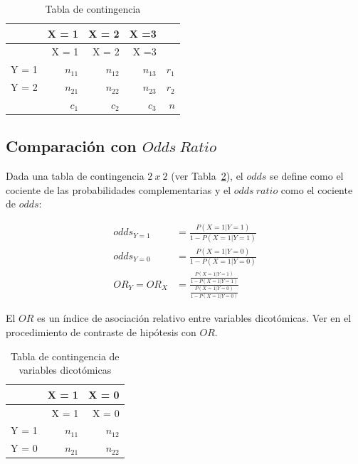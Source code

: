 \documentclass[
  12pt,
  a4paper,
  extrafontsizes,
  onecolumn,
  openright]{memoir}
\begin{document}
\hypertarget{tbl-contingencia}{}
\begin{longtable}[]{@{}lrrrr@{}}
\caption{\label{tbl-contingencia}Tabla de contingencia}\tabularnewline
\toprule\noalign{}
& X = 1 & X = 2 & X =3 & \\
\midrule\noalign{}
\endfirsthead
\toprule\noalign{}
& X = 1 & X = 2 & X =3 & \\
\midrule\noalign{}
\endhead
\bottomrule\noalign{}
\endlastfoot
Y = 1 & \(n_{11}\) & \(n_{12}\) & \(n_{13}\) & \(r_1\) \\
Y = 2 & \(n_{21}\) & \(n_{22}\) & \(n_{23}\) & \(r_2\) \\
& \(c_1\) & \(c_2\) & \(c_3\) & \(n\) \\
\end{longtable}

\hypertarget{sec-or}{%
\subsection{\texorpdfstring{Comparación con
\(Odds\ Ratio\)}{Comparación con Odds\textbackslash{} Ratio}}\label{sec-or}}

Dada una tabla de contingencia \(2\ x\ 2\) (ver
Tabla~\ref{tbl-contingencia-3}), el \(odds\) se define como el cociente
de las probabilidades complementarias y el \(odds\ ratio\) como el
cociente de \(odds\):

\[
\begin{aligned}
odds_{Y=1} &= \frac{P(X=1|Y=1)}{1-P(X=1|Y=1)}\\
odds_{Y=0} &= \frac{P(X=1|Y=0)}{1-P(X=1|Y=0)}\\
OR_Y = OR_X &=\frac{\frac{P(X=1|Y=1)}{1-P(X=1|Y=1)}}{\frac{P(X=1|Y=0)}{1-P(X=1|Y=0)}}
\end{aligned}
\]

El \(OR\) es un índice de asociación relativo entre variables
dicotómicas. Ver en \textcite{leton2021} el procedimiento de contraste
de hipótesis con \(OR\).

\hypertarget{tbl-contingencia-3}{}
\begin{longtable}[]{@{}lrr@{}}
\caption{\label{tbl-contingencia-3}Tabla de contingencia de variables
dicotómicas}\tabularnewline
\toprule\noalign{}
& X = 1 & X = 0 \\
\midrule\noalign{}
\endfirsthead
\toprule\noalign{}
& X = 1 & X = 0 \\
\midrule\noalign{}
\endhead
\bottomrule\noalign{}
\endlastfoot
Y = 1 & \(n_{11}\) & \(n_{12}\) \\
Y = 0 & \(n_{21}\) & \(n_{22}\) \\
\end{longtable}
\end{document}
